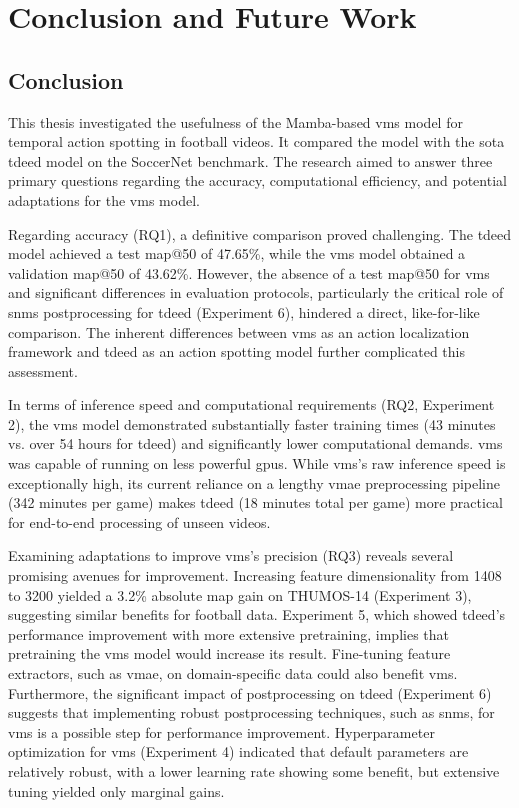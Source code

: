 \chapter{Conclusion and Future Work}
\label{chap:conclusion}

\section{Conclusion}
\label{sec:conclusion}
This thesis investigated the usefulness of the Mamba-based \acrfull{vms} model for temporal action spotting in football videos. It compared the model with the \acrfull{sota} \acrfull{tdeed} model on the SoccerNet benchmark. The research aimed to answer three primary questions regarding the accuracy, computational efficiency, and potential adaptations for the \acrshort{vms} model.

Regarding accuracy (RQ1), a definitive comparison proved challenging. The \acrshort{tdeed} model achieved a test \acrshort{map}@50 of 47.65\%, while the \acrshort{vms} model obtained a validation \acrshort{map}@50 of 43.62\%. However, the absence of a test \acrshort{map}@50 for \acrshort{vms} and significant differences in evaluation protocols, particularly the critical role of \acrfull{snms} postprocessing for \acrshort{tdeed} (Experiment 6), hindered a direct, like-for-like comparison. The inherent differences between \acrshort{vms} as an action localization framework and \acrshort{tdeed} as an action spotting model further complicated this assessment.

In terms of inference speed and computational requirements (RQ2, Experiment 2), the \acrshort{vms} model demonstrated substantially faster training times (43 minutes vs. over 54 hours for \acrshort{tdeed}) and significantly lower computational demands. \acrshort{vms} was capable of running on less powerful \acrshort{gpu}s. While \acrshort{vms}'s raw inference speed is exceptionally high, its current reliance on a lengthy \acrshort{vmae} preprocessing pipeline (342 minutes per game) makes \acrshort{tdeed} (18 minutes total per game) more practical for end-to-end processing of unseen videos.

Examining adaptations to improve \acrshort{vms}'s precision (RQ3) reveals several promising avenues for improvement. Increasing feature dimensionality from 1408 to 3200 yielded a 3.2\% absolute \acrshort{map} gain on THUMOS-14 (Experiment 3), suggesting similar benefits for football data. Experiment 5, which showed \acrshort{tdeed}'s performance improvement with more extensive pretraining, implies that pretraining the \acrshort{vms} model would increase its result. Fine-tuning feature extractors, such as \acrshort{vmae}, on domain-specific data could also benefit \acrshort{vms}. Furthermore, the significant impact of postprocessing on \acrshort{tdeed} (Experiment 6) suggests that implementing robust postprocessing techniques, such as \acrshort{snms}, for \acrshort{vms} is a possible step for performance improvement. Hyperparameter optimization for \acrshort{vms} (Experiment 4) indicated that default parameters are relatively robust, with a lower learning rate showing some benefit, but extensive tuning yielded only marginal gains.

